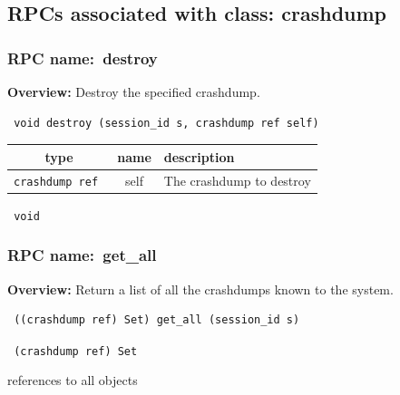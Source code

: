 \subsection{RPCs associated with class: crashdump}
\subsubsection{RPC name:~destroy}

{\bf Overview:} 
Destroy the specified crashdump.

\begin{verbatim} void destroy (session_id s, crashdump ref self)\end{verbatim}



 
\vspace{0.3cm}
\begin{tabular}{|c|c|p{7cm}|}
 \hline
{\bf type} & {\bf name} & {\bf description} \\ \hline
{\tt crashdump ref } & self & The crashdump to destroy \\ \hline 

\end{tabular}

\vspace{0.3cm}

{\tt 
void
}



\vspace{0.3cm}
\vspace{0.3cm}
\vspace{0.3cm}
\subsubsection{RPC name:~get\_all}

{\bf Overview:} 
Return a list of all the crashdumps known to the system.

\begin{verbatim} ((crashdump ref) Set) get_all (session_id s)\end{verbatim}


\vspace{0.3cm}

{\tt 
(crashdump ref) Set
}


references to all objects
\vspace{0.3cm}
\vspace{0.3cm}
\vspace{0.3cm}
